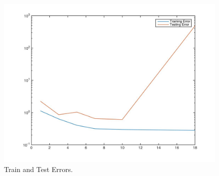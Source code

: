 \documentclass[a4paper, 11pt]{article}
\begin{document}
\begin{enumerate}[(a)]
\begin{figure}
\centering
\includegraphics[scale=0.25]{lr2.jpg}
\caption[lr3]{Train and Test Errors.}
\label{fig:lr3}
\end{figure}

\end{enumerate}

\end{document}
